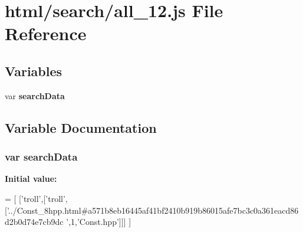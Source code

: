 \section{html/search/all\-\_\-12.js File Reference}
\label{all__12_8js}
\subsection*{Variables}
\begin{DoxyCompactItemize}
\item 
var {\bf search\-Data}
\end{DoxyCompactItemize}


\subsection{Variable Documentation}
\subsubsection[{search\-Data}]{\setlength{\rightskip}{0pt plus 5cm}var search\-Data}\label{all__12_8js_ad01a7523f103d6242ef9b0451861231e}
{\bfseries Initial value\-:}
\begin{DoxyCode}
=
[
  [\textcolor{stringliteral}{'troll'},[\textcolor{stringliteral}{'troll'},[\textcolor{stringliteral}{'../Const\_8hpp.html#a571b8eb16445af41bf2410b919b86015afe7bc3c0a361eacd86d2b0d74e7cb9dc
      '},1,\textcolor{stringliteral}{'Const.hpp'}]]]
]
\end{DoxyCode}

